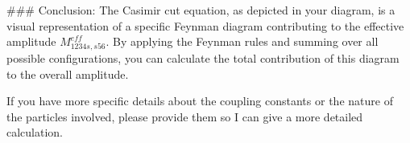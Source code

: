 ### Conclusion:
The Casimir cut equation, as depicted in your diagram, is a visual representation of a specific Feynman diagram contributing to the effective amplitude \(M_{1234s,s56}^{eff}\). By applying the Feynman rules and summing over all possible configurations, you can calculate the total contribution of this diagram to the overall amplitude.

If you have more specific details about the coupling constants or the nature of the particles involved, please provide them so I can give a more detailed calculation.
